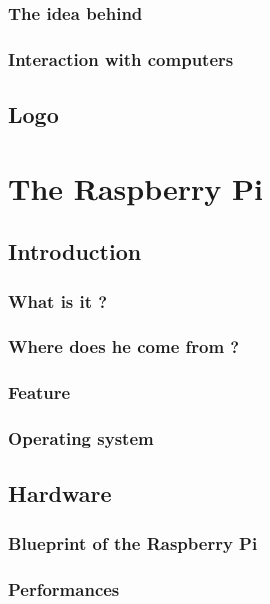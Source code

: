 \documentclass[10pt,a4paper]{article}
\begin{document}
\subsubsection{The idea behind}

\subsubsection{Interaction with computers}

\subsection{Logo}

\section{The Raspberry Pi}

\subsection{Introduction}

\subsubsection{What is it ?}

\subsubsection{Where does he come from ?}

\subsubsection{Feature}

\subsubsection{Operating system}

\subsection{Hardware}

\subsubsection{Blueprint of the Raspberry Pi}

\subsubsection{Performances}
\end{document}
